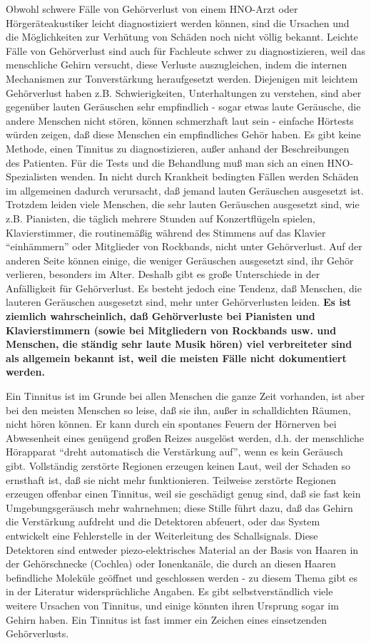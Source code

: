 Obwohl schwere Fälle von Gehörverlust von einem HNO-Arzt oder Hörgeräteakustiker leicht diagnostiziert werden können, sind die Ursachen und die Möglichkeiten zur Verhütung von Schäden noch nicht völlig bekannt.
Leichte Fälle von Gehörverlust sind auch für Fachleute schwer zu diagnostizieren, weil das menschliche Gehirn versucht, diese Verluste auszugleichen, indem die internen Mechanismen zur Tonverstärkung heraufgesetzt werden.
Diejenigen mit leichtem Gehörverlust haben z.B. Schwierigkeiten, Unterhaltungen zu verstehen, sind aber gegenüber lauten Geräuschen sehr empfindlich - sogar etwas laute Geräusche, die andere Menschen nicht stören, können schmerzhaft laut sein - einfache Hörtests würden zeigen, daß diese Menschen ein empfindliches Gehör haben.
Es gibt keine Methode, einen Tinnitus zu diagnostizieren, außer anhand der Beschreibungen des Patienten.
Für die Tests und die Behandlung muß man sich an einen HNO-Spezialisten wenden.
In nicht durch Krankheit bedingten Fällen werden Schäden im  allgemeinen dadurch verursacht, daß jemand lauten  Geräuschen ausgesetzt ist.
Trotzdem leiden viele Menschen, die sehr lauten Geräuschen ausgesetzt sind, wie z.B. Pianisten, die täglich mehrere Stunden auf Konzertflügeln spielen, Klavierstimmer, die routinemäßig während des Stimmens auf das Klavier \enquote{einhämmern} oder Mitglieder von Rockbands, nicht unter Gehörverlust.
Auf der anderen Seite können einige, die weniger Geräuschen ausgesetzt sind, ihr Gehör verlieren, besonders im Alter.
Deshalb gibt es große Unterschiede in der Anfälligkeit für Gehörverlust.
Es besteht jedoch eine Tendenz, daß Menschen, die lauteren Geräuschen ausgesetzt sind, mehr unter Gehörverlusten leiden.
\textbf{Es ist ziemlich wahrscheinlich, daß Gehörverluste bei Pianisten und Klavierstimmern (sowie bei Mitgliedern von Rockbands usw. und Menschen, die ständig sehr laute Musik hören) viel verbreiteter sind als allgemein bekannt ist, weil die meisten Fälle nicht dokumentiert werden.}

Ein Tinnitus ist im Grunde bei allen Menschen die ganze Zeit vorhanden, ist aber bei den meisten Menschen so leise, daß sie ihn, außer in schalldichten Räumen, nicht hören können.
Er kann durch ein spontanes Feuern der Hörnerven bei Abwesenheit eines genügend großen Reizes ausgelöst werden, d.h. der menschliche Hörapparat \enquote{dreht automatisch die Verstärkung auf}, wenn es kein Geräusch gibt.
Vollständig zerstörte Regionen erzeugen keinen Laut, weil der Schaden so ernsthaft ist, daß sie nicht mehr funktionieren.
Teilweise zerstörte Regionen erzeugen offenbar einen Tinnitus, weil sie geschädigt genug sind, daß sie fast kein Umgebungsgeräusch mehr wahrnehmen; diese Stille führt dazu, daß das Gehirn die Verstärkung aufdreht und die Detektoren abfeuert, oder das System entwickelt eine Fehlerstelle in der Weiterleitung des Schallsignals.
Diese Detektoren sind entweder piezo-elektrisches Material an der Basis von Haaren in der Gehörschnecke (Cochlea) oder Ionenkanäle, die durch an diesen Haaren befindliche Moleküle geöffnet und geschlossen werden - zu diesem Thema gibt es in der Literatur widersprüchliche Angaben.
Es gibt selbstverständlich viele weitere Ursachen von Tinnitus, und einige könnten ihren Ursprung sogar im Gehirn haben.
Ein Tinnitus ist fast immer ein Zeichen eines einsetzenden Gehörverlusts.

